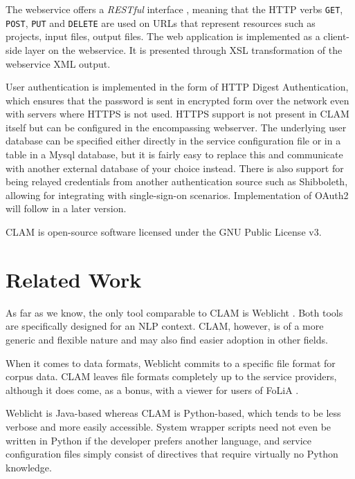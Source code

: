 \documentclass[11pt]{article}
\begin{document}
The webservice offers a \emph{RESTful} interface \cite{REST}, meaning that the HTTP
verbs \texttt{GET}, \texttt{POST}, \texttt{PUT} and \texttt{DELETE} are used on
URLs that represent resources such as projects, input files, output files. The
web application is implemented as a client-side layer on the webservice. It is
presented through XSL transformation \cite{XSLT} of the webservice XML output.

User authentication is implemented in the form of HTTP Digest Authentication,
which ensures that the password is sent in encrypted form over the network even
with servers where HTTPS is not used. HTTPS support is not present in CLAM
itself but can be configured in the encompassing webserver. The underlying user
database can be specified either directly in the service configuration file or
in a table in a Mysql database, but it is fairly easy to replace this and
communicate with another external database of your choice instead. There is
also support for being relayed credentials from another authentication source
such as Shibboleth, allowing for integrating with single-sign-on scenarios.
Implementation of OAuth2 will follow in a later version.

CLAM is open-source software licensed under the GNU Public License v3.

\section{Related Work}

As far as we know, the only tool comparable to CLAM is Weblicht
\cite{WEBLICHT}. Both tools are specifically designed for an NLP context. CLAM,
however, is of a more generic and flexible nature and may also find easier
adoption in other fields.

When it comes to data formats, Weblicht commits to a specific file format for
corpus data. CLAM leaves file formats completely up to the service providers,
although it does come, as a bonus, with a viewer for users of FoLiA \cite{FOLIA}.

Weblicht is Java-based whereas CLAM is Python-based, which tends to be less
verbose and more easily accessible. System wrapper scripts need not even be
written in Python if the developer prefers another language, and service
configuration files simply consist of directives that require virtually
no Python knowledge.
\end{document}
